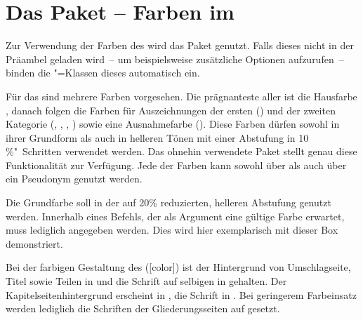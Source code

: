 \begin{Declaration*}{}
\begin{Declaration}{}
\begin{Declaration}[v2.02]{}
\end{Declaration}
\end{Declaration}
\end{Declaration*}


\section{Das Paket  -- Farben im \CD}%
\begin{Declaration*}{}
%
%
Zur Verwendung der Farben des \CDs wird das Paket  
genutzt. Falls dieses nicht in der Präambel geladen wird~-- um beispielsweise 
zusätzliche Optionen aufzurufen~-- binden die \TUDScript"=Klassen dieses 
automatisch ein.

Für das \CD sind mehrere Farben vorgesehen. Die prägnanteste aller ist die 
Hausfarbe , danach folgen die Farben für Auszeichnungen der ersten
() und der zweiten Kategorie (, , 
, ) sowie eine Ausnahmefarbe (). 
Diese Farben dürfen sowohl in ihrer Grundform als auch in helleren Tönen mit 
einer Abstufung in 10\,\%"~Schritten verwendet werden. Das ohnehin verwendete 
Paket  stellt genau diese Funktionalität zur Verfügung. Jede 
der Farben kann sowohl über  als auch über ein 
Pseudonym  genutzt werden.
%
\begin{Example*}
Die Grundfarbe  soll in der auf 20\% reduzierten, helleren 
Abstufung genutzt werden. Innerhalb eines Befehls, der als Argument eine 
gültige Farbe erwartet, muss lediglich  angegeben 
werden. Dies wird hier exemplarisch mit dieser \colorbox{HKS44!20}{%
  Box %
} demonstriert.
\end{Example*}
%
Bei der farbigen Gestaltung des \CDs ([color]) ist der Hintergrund 
von Umschlagseite, Titel sowie Teilen in  und die Schrift auf 
selbigen in  gehalten. Der Kapitelseitenhintergrund
erscheint in , die Schrift in . Bei 
geringerem Farbeinsatz werden lediglich die Schriften der Gliederungsseiten auf 
 gesetzt.


\end{Declaration*}
